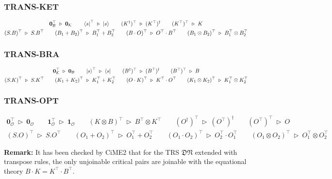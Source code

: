 \documentclass[manuscript, review, timestamp]{acmart}
\newcommand*{\reduce}{\ \triangleright\ }
\begin{document}
\subsubsection*{\textsf{TRANS-KET}}
\begin{gather*}
  \mathbf{0}_\mathcal{B}^\top \reduce \mathbf{0}_\mathcal{K}
  \qquad
  \bra{s}^\top \reduce \ket{s}
  \qquad
  (K^\dagger)^\top \reduce (K^\top)^\dagger
  \qquad
  (K^\top)^\top \reduce K \\
  (S . B)^\top \reduce S . B^\top
  \qquad
  (B_1 + B_2)^\top \reduce B_1^\top + B_2^\top
  \qquad
  (B \cdot O)^\top \reduce O^\top \cdot B^\top
  \qquad
  (B_1 \otimes B_2)^\top \reduce B_1^\top \otimes B_2^\top
\end{gather*}

\subsubsection*{\textsf{TRANS-BRA}}
\begin{gather*}
  \mathbf{0}_\mathcal{K}^\top \reduce \mathbf{0}_\mathcal{B}
  \qquad
  \ket{s}^\top \reduce \bra{s}
  \qquad
  (B^\dagger)^\top \reduce (B^\top)^\dagger
  \qquad
  (B^\top)^\top \reduce B \\
  (S . K)^\top \reduce S . K^\top
  \qquad
  (K_1 + K_2)^\top \reduce K_1^\top + K_2^\top
  \qquad
  (O \cdot K)^\top \reduce K^\top \cdot O^\top
  \qquad
  (K_1 \otimes K_2)^\top \reduce K_1^\top \otimes K_2^\top
\end{gather*}



\subsubsection*{\textsf{TRANS-OPT}}
\begin{gather*}
  \mathbf{0}_\mathcal{O}^\top \reduce \mathbf{0}_\mathcal{O}
  \qquad
  \mathbf{1}_\mathcal{O}^\top \reduce \mathbf{1}_\mathcal{O}
  \qquad
  (K \otimes B)^\top \reduce B^\top \otimes K^\top
  \qquad
  (O^\dagger)^\top \reduce (O^\top)^\dagger
  \qquad
  (O^\top)^\top \reduce O \\
  (S . O)^\top \reduce S . O^\top
  \qquad
  (O_1 + O_2)^\top \reduce O_1^\top + O_2^\top
  \qquad
  (O_1 \cdot O_2)^\top \reduce O_2^\top \cdot O_1^\top
  \qquad
  (O_1 \otimes O_2)^\top \reduce O_1^\top \otimes O_2^\top
\end{gather*}

\textbf{Remark:} It has been checked by CiME2 that for the TRS $\mathfrak{DN}$ extended with transpose rules, the only unjoinable critical pairs are joinable with the equational theory $B\cdot K = K^\top \cdot B^\top$.
\end{document}
